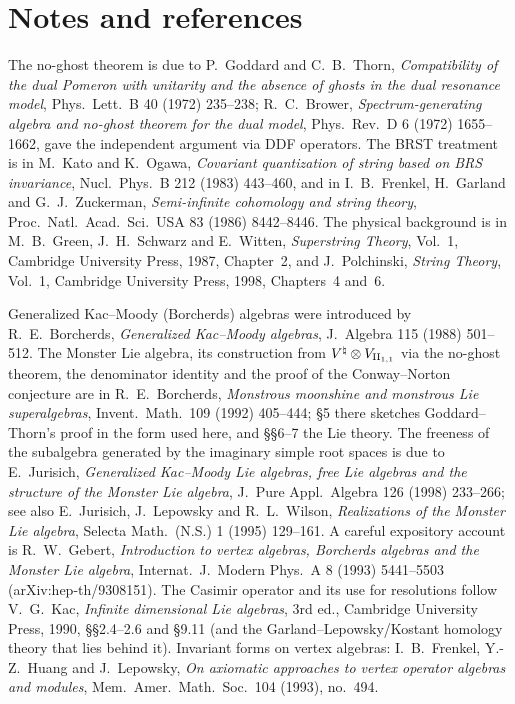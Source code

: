 \section{Notes and references}\label{ch18:sec:notes}

The no-ghost theorem is due to P.~Goddard and C.~B.~Thorn, \emph{Compatibility of the dual Pomeron with unitarity and the absence of
ghosts in the dual resonance model}, Phys.\ Lett.\ B 40 (1972) 235--238; R.~C.~Brower, \emph{Spectrum-generating algebra and no-ghost
theorem for the dual model}, Phys.\ Rev.\ D 6 (1972) 1655--1662, gave the independent argument via DDF operators.  The BRST
treatment is in M.~Kato and K.~Ogawa, \emph{Covariant quantization of string based on BRS invariance}, Nucl.\ Phys.\ B 212 (1983) 443--460,
and in I.~B.~Frenkel, H.~Garland and G.~J.~Zuckerman, \emph{Semi-infinite cohomology and string theory}, Proc.\ Natl.\ Acad.\ Sci.\ USA 83
(1986) 8442--8446.  The physical background is in M.~B.~Green, J.~H.~Schwarz and E.~Witten, \emph{Superstring Theory}, Vol.~1, Cambridge
University Press, 1987, Chapter~2, and J.~Polchinski, \emph{String Theory}, Vol.~1, Cambridge University Press, 1998, Chapters~4 and~6.

Generalized Kac--Moody (Borcherds) algebras were introduced by R.~E.~Borcherds, \emph{Generalized Kac--Moody algebras}, J.\ Algebra 115
(1988) 501--512.  The Monster Lie algebra, its construction from ${V^{\natural}}\otimes V_{\mathrm{II}_{1,1}}$ via the no-ghost theorem, the denominator
identity and the proof of the Conway--Norton conjecture are in R.~E.~Borcherds, \emph{Monstrous moonshine and monstrous Lie superalgebras},
Invent.\ Math.\ 109 (1992) 405--444; §5 there sketches Goddard--Thorn's proof in the form used here, and §§6--7 the Lie theory.  The
freeness of the subalgebra generated by the imaginary simple root spaces is due to E.~Jurisich, \emph{Generalized Kac--Moody Lie algebras,
free Lie algebras and the structure of the Monster Lie algebra}, J.\ Pure Appl.\ Algebra 126 (1998) 233--266; see also E.~Jurisich,
J.~Lepowsky and R.~L.~Wilson, \emph{Realizations of the Monster Lie algebra}, Selecta Math.\ (N.S.) 1 (1995) 129--161.  A careful expository
account is R.~W.~Gebert, \emph{Introduction to vertex algebras, Borcherds algebras and the Monster Lie algebra}, Internat.\ J.\ Modern Phys.\
A 8 (1993) 5441--5503 (arXiv:hep-th/9308151).  The Casimir operator and its use for resolutions follow V.~G.~Kac, \emph{Infinite dimensional
Lie algebras}, 3rd ed., Cambridge University Press, 1990, §§2.4--2.6 and §9.11 (and the Garland--Lepowsky/Kostant homology theory that
lies behind it).  Invariant forms on vertex algebras: I.~B.~Frenkel, Y.-Z.~Huang and J.~Lepowsky, \emph{On axiomatic approaches to vertex
operator algebras and modules}, Mem.\ Amer.\ Math.\ Soc.\ 104 (1993), no.~494.

